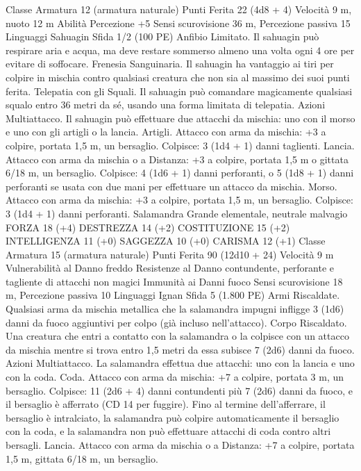 \begin{multicols}{2}
Classe Armatura 12 (armatura naturale)
Punti Ferita 22 (4d8 + 4)
Velocità 9 m, nuoto 12 m
Abilità Percezione +5
Sensi scurovisione 36 m, Percezione passiva 15
Linguaggi Sahuagin
Sfida 1/2 (100 PE)
Anfibio Limitato. Il sahuagin può respirare aria e acqua, ma deve
restare sommerso almeno una volta ogni 4 ore per evitare di
soffocare.
Frenesia Sanguinaria. Il sahuagin ha vantaggio ai tiri per
colpire in mischia contro qualsiasi creatura che non sia al
massimo dei suoi punti ferita.
Telepatia con gli Squali. Il sahuagin può comandare
magicamente qualsiasi squalo entro 36 metri da sé, usando una
forma limitata di telepatia.
Azioni
Multiattacco. Il sahuagin può effettuare due attacchi da mischia:
uno con il morso e uno con gli artigli o la lancia.
Artigli. Attacco con arma da mischia: +3 a colpire, portata 1,5
m, un bersaglio.
Colpisce: 3 (1d4 + 1) danni taglienti.
Lancia. Attacco con arma da mischia o a Distanza: +3 a colpire,
portata 1,5 m o gittata 6/18 m, un bersaglio.
Colpisce: 4 (1d6 + 1) danni perforanti, o 5 (1d8 + 1) danni
perforanti se usata con due mani per effettuare un attacco da
mischia.
Morso. Attacco con arma da mischia: +3 a colpire, portata 1,5
m, un bersaglio.
Colpisce: 3 (1d4 + 1) danni perforanti.
Salamandra
Grande elementale, neutrale malvagio
FORZA 18 (+4)
DESTREZZA 14 (+2)
COSTITUZIONE 15 (+2)
INTELLIGENZA 11 (+0)
SAGGEZZA 10 (+0)
CARISMA 12 (+1)
Classe Armatura 15 (armatura naturale)
Punti Ferita 90 (12d10 + 24)
Velocità 9 m
Vulnerabilità al Danno freddo
Resistenze al Danno contundente, perforante e tagliente di
attacchi non magici
Immunità ai Danni fuoco
Sensi scurovisione 18 m, Percezione passiva 10
Linguaggi Ignan
Sfida 5 (1.800 PE)
Armi Riscaldate. Qualsiasi arma da mischia metallica che la
salamandra impugni infligge 3 (1d6) danni da fuoco aggiuntivi
per colpo (già incluso nell’attacco).
Corpo Riscaldato. Una creatura che entri a contatto con la
salamandra o la colpisce con un attacco da mischia mentre si
trova entro 1,5 metri da essa subisce 7 (2d6) danni da fuoco.
Azioni
Multiattacco. La salamandra effettua due attacchi: uno con la
lancia e uno con la coda.
Coda. Attacco con arma da mischia: +7 a colpire, portata 3 m,
un bersaglio.
Colpisce: 11 (2d6 + 4) danni contundenti più 7 (2d6) danni da
fuoco, e il bersaglio è afferrato (CD 14 per fuggire). Fino al
termine dell’afferrare, il bersaglio è intralciato, la salamandra
può colpire automaticamente il bersaglio con la coda, e la
salamandra non può effettuare attacchi di coda contro altri
bersagli.
Lancia. Attacco con arma da mischia o a Distanza: +7 a colpire,
portata 1,5 m, gittata 6/18 m, un bersaglio.

\end{multicols}

